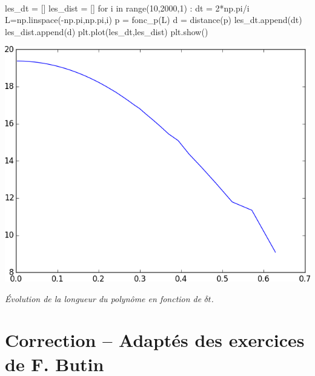 \documentclass[10pt,fleqn]{article} %
\begin{document}
\begin{corrige}
$\quad$
\begin{python}
les_dt = []
les_dist = []
for i in range(10,2000,1) :
    dt = 2*np.pi/i
    L=np.linspace(-np.pi,np.pi,i)
    p = fonc_p(L)
    d = distance(p)
    les_dt.append(dt)
    les_dist.append(d)
plt.plot(les_dt,les_dist)
plt.show()       
\end{python}
\end{corrige}


\begin{center}
\includegraphics[width=.4\linewidth]{programmes/Exercice_12/figure_2}

\textit{Évolution de la longueur du polynôme en fonction de $\delta t$.}
\end{center}



\newpage 

\section{Correction -- Adaptés des exercices de F. Butin}
\end{document}
